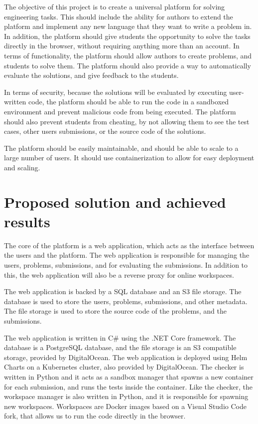 \documentclass[12pt,a4paper]{report}
\begin{document}
The objective of this project is to create a universal platform for solving engineering tasks. This should include the ability for authors to extend the platform and implement any new language that they want to write a problem in. In addition, the platform should give students the opportunity to solve the tasks directly in the browser, without requiring anything more than an account.
In terms of functionality, the platform should allow authors to create problems, and students to solve them. The platform should also provide a way to automatically evaluate the solutions, and give feedback to the students.

In terms of security, because the solutions will be evaluated by executing user-written code, the platform should be able to run the code in a sandboxed environment and prevent malicious code from being executed. The platform should also prevent students from cheating, by not allowing them to see the test cases, other users submissions, or the source code of the solutions.

The platform should be easily maintainable, and should be able to scale to a large number of users. It should use containerization to allow for easy deployment and scaling.

\section{Proposed solution and achieved results}
The core of the platform is a web application, which acts as the interface between the users and the platform. The web application is responsible for managing the users, problems, submissions, and for evaluating the submissions. In addition to this, the web application will also be a reverse proxy for online workspaces.

The web application is backed by a SQL database and an S3 file storage. The database is used to store the users, problems, submissions, and other metadata. The file storage is used to store the source code of the problems, and the submissions.

The web application is written in C\# using the .NET Core framework. The database is a PostgreSQL database, and the file storage is an S3 compatible storage, provided by DigitalOcean. The web application is deployed using Helm Charts on a Kubernetes cluster, also provided by DigitalOcean. The checker is written in Python and it acts as a sandbox manager that spawns a new container for each submission, and runs the tests inside the container. Like the checker, the workspace manager is also written in Python, and it is responsible for spawning new workspaces. Workspaces are Docker images based on a Visual Studio Code fork, that allows us to run the code directly in the browser.
\end{document}
